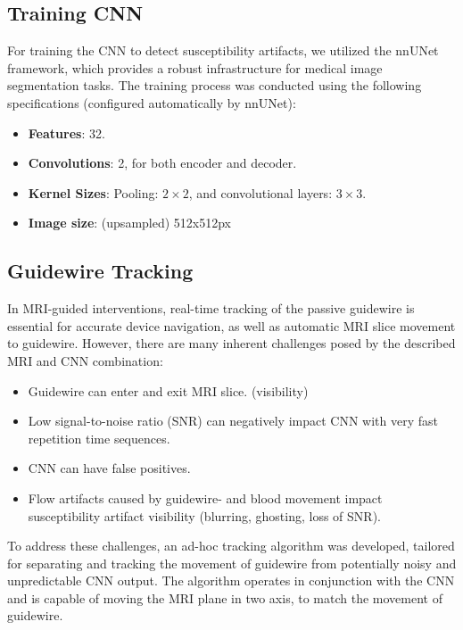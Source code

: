\documentclass[conference]{IEEEtran}
\begin{document}
\subsection{Training CNN}\label{training-cnn}
For training the CNN to detect susceptibility artifacts, we utilized the nnUNet framework, which provides a robust infrastructure for medical image segmentation tasks. The training process was conducted using the following specifications (configured automatically by nnUNet):

\begin{itemize}
    \item \textbf{Features}: 32.
    \item \textbf{Convolutions}: 2, for both encoder and decoder.
    \item \textbf{Kernel Sizes}: Pooling: \(2 \times 2\), and convolutional layers: \(3 \times 3\).
    \item \textbf{Image size}: (upsampled) 512x512px
\end{itemize}

\subsection{Guidewire Tracking}\label{guidewire-tracking}
In MRI-guided interventions, real-time tracking of the passive guidewire is essential for accurate device navigation, as well as automatic MRI slice movement to guidewire. However, there are many inherent challenges posed by the described MRI and CNN combination:
\begin{itemize}
    \item Guidewire can enter and exit MRI slice. (visibility)
    \item Low signal-to-noise ratio (SNR) can negatively impact CNN with very fast repetition time sequences.
    \item CNN can have false positives.
    \item Flow artifacts caused by guidewire- and blood movement impact susceptibility artifact visibility (blurring, ghosting, loss of SNR).
\end{itemize}

To address these challenges, an ad-hoc tracking algorithm was developed, tailored for separating and tracking the movement of guidewire from potentially noisy and unpredictable CNN output. The algorithm operates in conjunction with the CNN and is capable of moving the MRI plane in two axis, to match the movement of guidewire.
\end{document}
